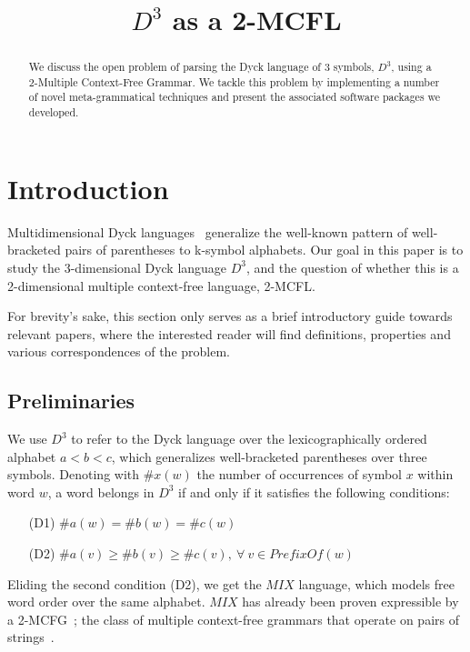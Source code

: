 \documentclass{llncs}
\title{$D^3$ as a 2-MCFL}
\begin{document}

\maketitle
\begin{abstract}
We discuss the open problem of parsing the Dyck language of 3 symbols, $D^3$, using a 2-Multiple Context-Free Grammar. We tackle this problem by implementing a number of novel meta-grammatical techniques and present the associated software packages we developed.

\end{abstract}

\section{Introduction}\label{sec1}
Multidimensional Dyck languages~\cite{moortgat} generalize the well-known pattern of well-bracketed pairs of parentheses to k-symbol alphabets. Our goal in this paper is to study the 3-dimensional Dyck language $D^3$, and the question of whether this is a 2-dimensional multiple context-free language, 2-MCFL.

For brevity's sake, this section only serves as a brief introductory guide towards relevant papers, where the interested reader will find definitions, properties and various correspondences of the problem. 

\subsection{Preliminaries}
We use $D^3$ to refer to the Dyck language over the lexicographically ordered alphabet $a < b < c$, which generalizes well-bracketed parentheses over three symbols. Denoting with $\#x(w)$ the number of occurrences of symbol $x$ within word $w$, a word belongs in $D^3$ if and only if it satisfies the following conditions:
\begin{itemize}
\item[(D1)] $ \#a(w) = \#b(w) = \#c(w) $
\item[(D2)] $ \#a(v) \geq \#b(v) \geq \#c(v),\ \forall \ v \in \textit{PrefixOf}(w)$
\end{itemize}
Eliding the second condition (D2), we get the $MIX$ language, which models free word order over the same alphabet.
$MIX$ has already been proven expressible by a 2-MCFG~\cite{salvati}; the class of multiple context-free grammars that operate on pairs of strings~\cite{gotzmann}.
\end{document}
